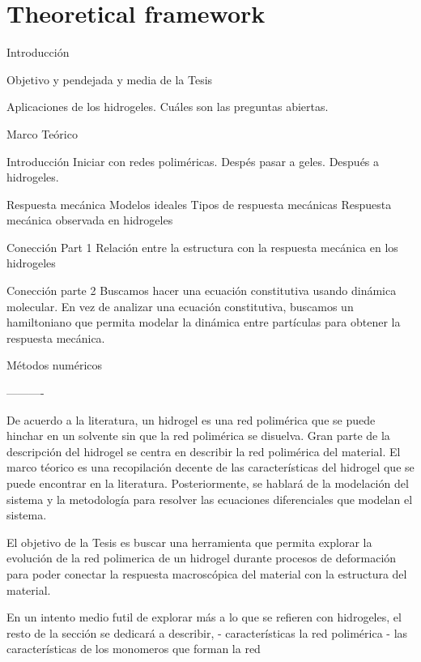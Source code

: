 \chapter{Theoretical framework}


Introducción

Objetivo y pendejada y media de la Tesis

Aplicaciones de los hidrogeles.
Cuáles son las preguntas abiertas.



Marco Teórico

Introducción
Iniciar con redes poliméricas.
Despés pasar a geles.
Después a hidrogeles.

Respuesta mecánica
Modelos ideales
Tipos de respuesta mecánicas
Respuesta mecánica observada en hidrogeles

Conección Part 1
Relación entre la estructura con la respuesta mecánica en los hidrogeles

Conección parte 2
Buscamos hacer una ecuación constitutiva usando dinámica molecular.
En vez de analizar una ecuación constitutiva, buscamos un hamiltoniano que permita modelar la dinámica entre partículas para obtener la respuesta mecánica.


Métodos numéricos

----------

De acuerdo a la literatura, un hidrogel es una red polimérica que se puede hinchar en un solvente sin que la red polimérica se disuelva.
Gran parte de la descripción del hidrogel se centra en describir la red polimérica del material.
El marco téorico es una recopilación decente de las características del hidrogel que se puede encontrar en la literatura.
Posteriormente, se hablará de la modelación del sistema y la metodología para resolver las ecuaciones diferenciales que modelan el sistema.

El objetivo de la Tesis es buscar una herramienta que permita explorar la evolución de la red polimerica de un hidrogel durante procesos de deformación para poder conectar la respuesta macroscópica del material con la estructura del material.


En un intento medio futil de explorar más a lo que se refieren con hidrogeles, el resto de la sección se dedicará a describir,
- características la red polimérica
- las características de los monomeros que forman la red




